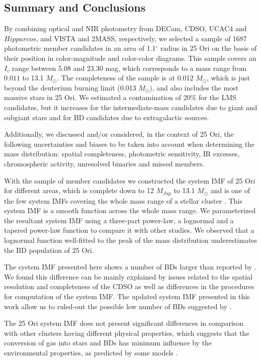 \documentclass[12pt]{article}
\begin{document}
\subsection{Summary and Conclusions}
\label{sec_IMF:conclusions}
By combining optical and NIR photometry from DECam, CDSO, UCAC4 and $Hipparcos$, and VISTA and 2MASS, respectively, we selected a sample of 1687 photometric member candidates in an area of 1.1$^\circ$ radius in 25 Ori on the basis of their position in color-magnitude and color-color diagrams. This sample covers an $I_c$ range between 5.08 and 23.30 mag, which corresponds to a mass range from $0.011$ to 13.1 $M_\odot$. The completeness of the sample is at 0.012 $M_\odot$, which is just beyond the deuterium burning limit (0.013 $M_\odot$), and also  includes the most massive stars in 25 Ori. We estimated a contamination of 20\% for the LMS candidates, but it increases for the intermediate-mass candidates due to giant and subgiant stars and for BD candidates due to extragalactic sources.

Additionally, we discussed and/or considered, in the context of 25 Ori, the following uncertainties and biases to be taken into account when determining the mass distribution: spatial completeness, photometric sensitivity, IR excesses, chromospheric activity, unresolved binaries and missed members.

With the sample of member candidates we constructed the system IMF of 25 Ori for different areas, which is complete down to 12 $M_{Jup}$ to 13.1 $M_\odot$ and is one of the few system IMFs covering the whole mass range of a stellar cluster \citep[e.g. the $\sigma$ Ori system IMF by ][]{PenaRamirez2012}. This system IMF is a smooth function across the whole mass range. We parameterized the resultant system IMF using a three-part power-law, a lognormal and a tapered power-law function to compare it with other studies. We observed that a lognormal function well-fitted to the peak of the mass distribution underestimates the BD population of 25 Ori.

The system IMF presented here shows a number of BDs larger than reported by \citet{Downes2014}. We found this difference can be mainly explained by issues related to the spatial resolution and completeness of the CDSO as well as differences in the procedures for computation of the system IMF. The updated system IMF presented in this work allow us to ruled-out the possible low number of BDs suggested by \citet{Downes2014}.

The 25 Ori system IMF does not present significant differences in comparison with other clusters having different physical properties, which suggests that the conversion of gas into stars and BDs has minimum influence by the environmental properties, as predicted by some models \citep[e.g. ][]{Bonnell2006,Elmegreen2008}.
\end{document}
